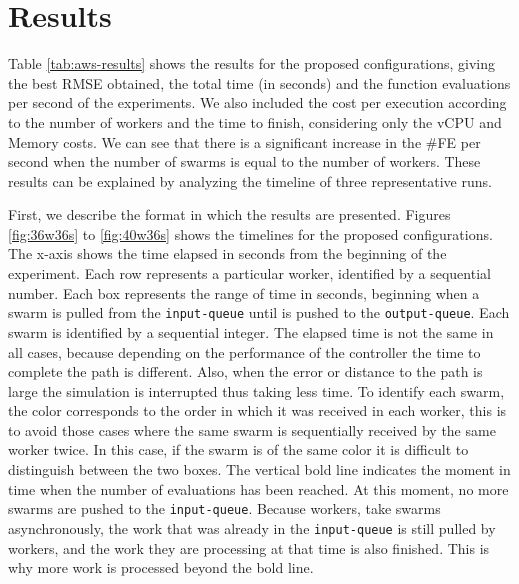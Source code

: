 \documentclass{cys}
\begin{document}
\section{Results}
\label{sec:results}

Table \ref{tab:aws-results} shows the results for the proposed 
configurations, giving the best RMSE obtained, the total time 
(in seconds) and the function evaluations per second of the experiments.
We also included the cost per execution according to the number of 
workers and the time to finish, considering only the vCPU and Memory costs. 
We can see that there is a significant increase in the \#FE per second when the 
number of swarms is equal to the number of workers. 
These results can be explained by analyzing the timeline of three representative runs. 

First, we describe the format in which the results are presented.
Figures \ref{fig:36w36s} to \ref{fig:40w36s} shows the timelines for the proposed 
configurations. The x-axis shows the time elapsed in seconds from 
the beginning of the experiment. Each row represents a particular worker, identified 
by a sequential number. Each box represents the range of time in seconds, beginning when a
swarm is pulled from the \texttt{input-queue} until is pushed to the \texttt{output-queue}.
Each swarm is identified by a sequential integer. The elapsed time is not the same in 
all cases, because depending on the performance of the controller the time to 
complete the path is different. Also, when the error or distance to 
the path is large the simulation is interrupted thus taking less time.
To identify each swarm, the color corresponds to the order in which it was received 
in each worker, this is to avoid those cases where the same swarm is sequentially received
by the same worker twice. In this case, if the swarm is of the same color it
is difficult to distinguish between the two boxes. The vertical bold line indicates 
the moment in time when the number of evaluations has been reached. At this moment,
no more swarms are pushed to the \texttt{input-queue}. Because workers,
take swarms asynchronously, the work that was already in the \texttt{input-queue} is still 
pulled by workers, and the work they are processing at that time is also finished. 
This is why more work is processed beyond the bold line.
\end{document}
